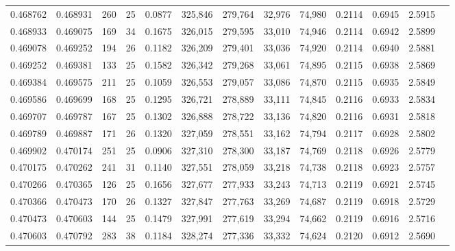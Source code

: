 \begin{tabular}{rrrrrrrrrrrrr}
0.468762 & 0.468931 &   260 &  25 &                                     0.0877 & 325,846 & 279,764 &  32,976 &  74,980 & 0.2114 & 0.6945 & 2.5915 \\
0.468933 & 0.469075 &   169 &  34 &                                     0.1675 & 326,015 & 279,595 &  33,010 &  74,946 & 0.2114 & 0.6942 & 2.5899 \\
0.469078 & 0.469252 &   194 &  26 &                                     0.1182 & 326,209 & 279,401 &  33,036 &  74,920 & 0.2114 & 0.6940 & 2.5881 \\
0.469252 & 0.469381 &   133 &  25 &                                     0.1582 & 326,342 & 279,268 &  33,061 &  74,895 & 0.2115 & 0.6938 & 2.5869 \\
0.469384 & 0.469575 &   211 &  25 &                                     0.1059 & 326,553 & 279,057 &  33,086 &  74,870 & 0.2115 & 0.6935 & 2.5849 \\
0.469586 & 0.469699 &   168 &  25 &                                     0.1295 & 326,721 & 278,889 &  33,111 &  74,845 & 0.2116 & 0.6933 & 2.5834 \\
0.469707 & 0.469787 &   167 &  25 &                                     0.1302 & 326,888 & 278,722 &  33,136 &  74,820 & 0.2116 & 0.6931 & 2.5818 \\
0.469789 & 0.469887 &   171 &  26 &                                     0.1320 & 327,059 & 278,551 &  33,162 &  74,794 & 0.2117 & 0.6928 & 2.5802 \\
0.469902 & 0.470174 &   251 &  25 &                                     0.0906 & 327,310 & 278,300 &  33,187 &  74,769 & 0.2118 & 0.6926 & 2.5779 \\
0.470175 & 0.470262 &   241 &  31 &                                     0.1140 & 327,551 & 278,059 &  33,218 &  74,738 & 0.2118 & 0.6923 & 2.5757 \\
0.470266 & 0.470365 &   126 &  25 &                                     0.1656 & 327,677 & 277,933 &  33,243 &  74,713 & 0.2119 & 0.6921 & 2.5745 \\
0.470366 & 0.470473 &   170 &  26 &                                     0.1327 & 327,847 & 277,763 &  33,269 &  74,687 & 0.2119 & 0.6918 & 2.5729 \\
0.470473 & 0.470603 &   144 &  25 &                                     0.1479 & 327,991 & 277,619 &  33,294 &  74,662 & 0.2119 & 0.6916 & 2.5716 \\
0.470603 & 0.470792 &   283 &  38 &                                     0.1184 & 328,274 & 277,336 &  33,332 &  74,624 & 0.2120 & 0.6912 & 2.5690 \\

\end{tabular}
